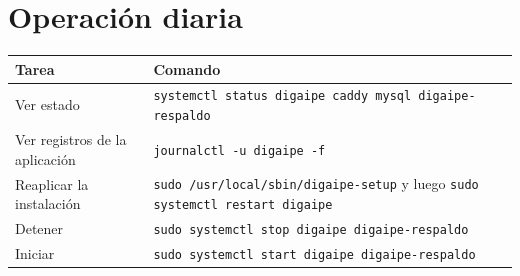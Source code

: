 \section{Operación diaria}

\begin{xltabular}{\linewidth}{@{}l L@{}}
	\toprule
	\textbf{Tarea} & \textbf{Comando} \\
	\midrule
	\endhead
	Ver estado & \texttt{systemctl status digaipe caddy mysql digaipe-respaldo} \\
	Ver registros de la aplicación & \texttt{journalctl -u digaipe -f} \\
	Reaplicar la instalación & \texttt{sudo /usr/local/sbin/digaipe-setup} y luego
	\texttt{sudo systemctl restart digaipe} \\
	Detener & \texttt{sudo systemctl stop digaipe digaipe-respaldo} \\
	Iniciar & \texttt{sudo systemctl start digaipe digaipe-respaldo} \\
	\bottomrule
\end{xltabular}
